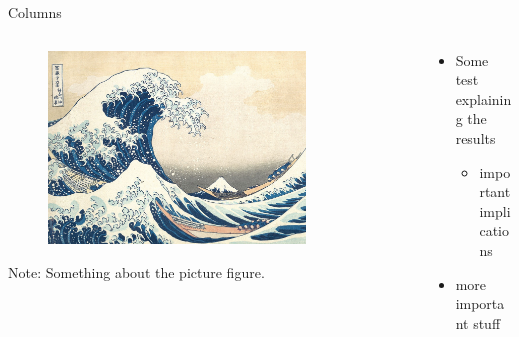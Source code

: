 \documentclass[aspectratio=169]{beamer}
\begin{document}
\begin{frame}[label=columns]{Columns}
\begin{columns}[T]
    \vspace{0pt}
    \begin{column}{.65\textwidth}
    
\begin{figure}
    \centering
    \includegraphics[width=0.8\textwidth]{kanagawa.jpg}
    \label{fig:figure1}
\end{figure}
\tiny{Note: Something about the picture figure.}
    \end{column}
    
    \begin{column}{.35\textwidth}
     \vspace{5mm}
     \begin{itemize}
         \item Some test explaining the results 
         \begin{itemize}
             \item important implications
         \end{itemize}
         \item more important stuff
     \end{itemize}
    \end{column}
    \end{columns} 
        


\end{frame}

\end{document}
